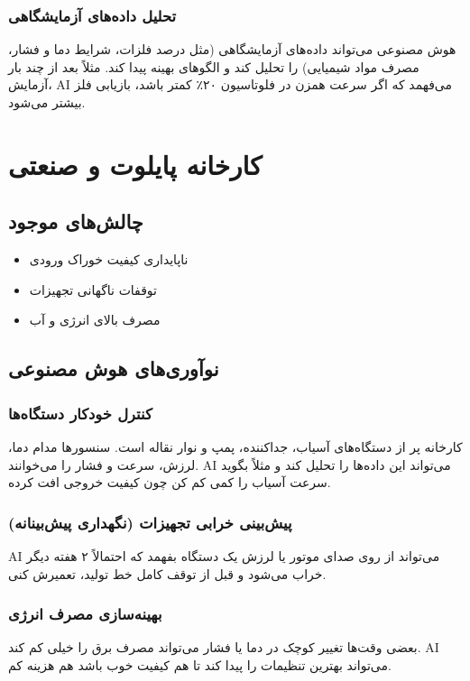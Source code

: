 \subsubsection*{تحلیل داده‌های آزمایشگاهی}
هوش مصنوعی می‌تواند داده‌های آزمایشگاهی (مثل درصد فلزات، شرایط دما و فشار، مصرف مواد شیمیایی) را تحلیل کند و الگوهای بهینه پیدا کند. مثلاً بعد از چند بار آزمایش، AI می‌فهمد که اگر سرعت همزن در فلوتاسیون ۲۰٪ کمتر باشد، بازیابی فلز بیشتر می‌شود.

\section{کارخانه پایلوت و صنعتی}

\subsection*{چالش‌های موجود}
\begin{itemize}
  \item ناپایداری کیفیت خوراک ورودی
  \item توقفات ناگهانی تجهیزات
  \item مصرف بالای انرژی و آب
\end{itemize}

\subsection*{نوآوری‌های هوش مصنوعی}

\subsubsection*{کنترل خودکار دستگاه‌ها}
کارخانه پر از دستگاه‌های آسیاب، جداکننده، پمپ و نوار نقاله است. سنسورها مدام دما، لرزش، سرعت و فشار را می‌خوانند. AI می‌تواند این داده‌ها را تحلیل کند و مثلاً بگوید سرعت آسیاب را کمی کم کن چون کیفیت خروجی افت کرده.

\subsubsection*{پیش‌بینی خرابی تجهیزات (نگهداری پیش‌بینانه)}
AI می‌تواند از روی صدای موتور یا لرزش یک دستگاه بفهمد که احتمالاً ۲ هفته دیگر خراب می‌شود و قبل از توقف کامل خط تولید، تعمیرش کنی.

\subsubsection*{بهینه‌سازی مصرف انرژی}
بعضی وقت‌ها تغییر کوچک در دما یا فشار می‌تواند مصرف برق را خیلی کم کند. AI می‌تواند بهترین تنظیمات را پیدا کند تا هم کیفیت خوب باشد هم هزینه کم.

